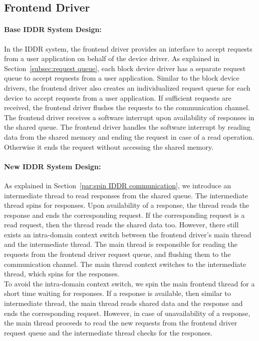 \subsection{Frontend Driver}
\paragraph{Base IDDR System Design:}
In the IDDR system, the frontend driver provides an interface to accept requests from a user application on behalf of the device driver. As explained in Section~\ref{subsec:request queue}, each block device driver has a separate request queue to accept requests from a user application. Similar to the block device drivers, the frontend driver also creates an individualized request queue for each device to accept requests from a user application. If sufficient requests are received, the frontend driver flushes the requests to the communication channel. The frontend driver receives a software interrupt upon availability of responses in the shared queue. The frontend driver handles the software interrupt by reading data from the shared memory and ending the request in case of a read operation. Otherwise it ends the request without accessing the shared memory.

\paragraph{New IDDR System Design:}
As explained in Section~\ref{par:spin IDDR communication}, we introduce an intermediate thread to read responses from the shared queue. The intermediate thread spins for responses. Upon availability of a response, the thread reads the response and ends the corresponding request. If the corresponding request is a read request, then the thread reads the shared data too. However, there still exists an intra-domain context switch between the frontend driver's main thread and the intermediate thread. The main thread is responsible for reading the requests from the frontend driver request queue, and flushing them to the communication channel. The main thread context switches to the intermediate thread, which spins for the responses. 
\\[3mm]
To avoid the intra-domain context switch, we spin the main frontend thread for a short time waiting for responses. If a response is available, then similar to intermediate thread, the main thread reads shared data and the response and ends the corresponding request. However, in case of unavailability of a response, the main thread proceeds to read the new requests from the frontend driver request queue and the intermediate thread checks for the responses.  

